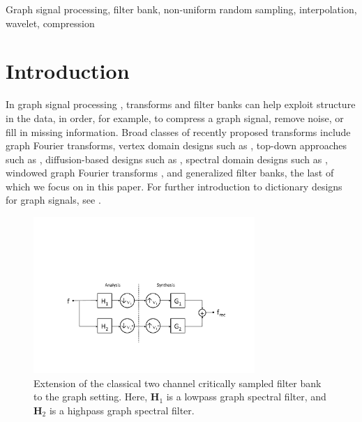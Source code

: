 \documentclass[journal, 10pt]{IEEEtran}
\begin{document}
\begin{IEEEkeywords}
Graph signal processing, filter bank, non-uniform random sampling, interpolation, wavelet, compression
\end{IEEEkeywords}
%

\section{Introduction}

In graph signal processing \cite{shuman2013emerging}, transforms and filter banks can help exploit structure in the data, in order, for example, to compress a graph signal, remove noise, or fill in missing information. 
Broad classes of recently proposed transforms include graph Fourier transforms, vertex domain designs such as \cite{Crovella2003,wang}, top-down approaches such as \cite{szlam,gavish,irion}, diffusion-based designs such as \cite{coifman2006diffusion,Maggioni_biorthogonal}, spectral domain designs such as \cite{hammond2011wavelets,shuman2013spectrum}, windowed graph Fourier transforms  \cite{shuman2015vertex}, and generalized filter banks, the last of which we focus on in this paper. For further introduction to dictionary designs for graph signals, see \cite{shuman2013emerging}.


\begin{figure}[t]
\centerline{\includegraphics[width=3.3in]{fig_two_channel_classical}}
\caption{Extension of the classical two channel critically sampled filter bank to the graph setting. Here, $\mathbf{H}_1$ is a lowpass graph spectral filter, and $\mathbf{H}_2$ is a highpass graph spectral filter.}\label{Fig:two_channel}
\end{figure}
\end{document}

